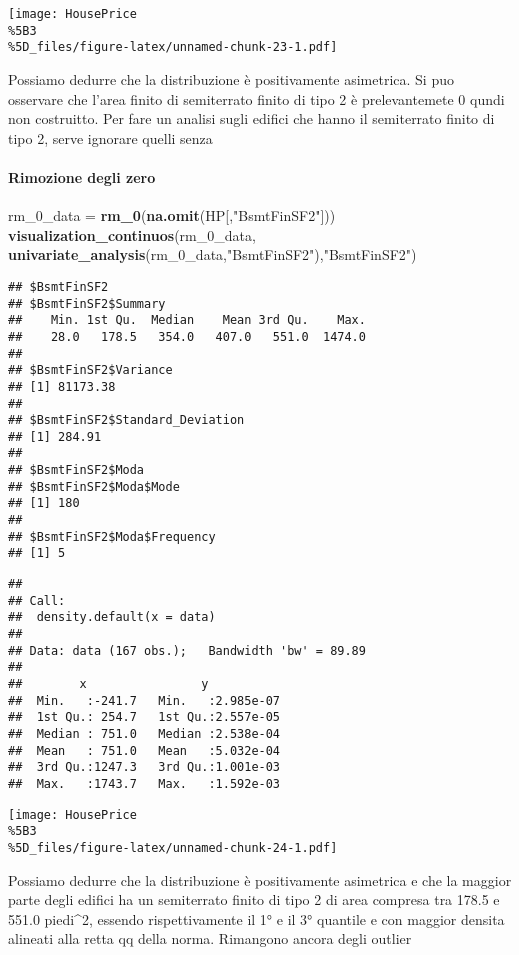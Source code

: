\documentclass[
]{article}
\newenvironment{Shaded}{\begin{snugshade}}{\end{snugshade}}
\newcommand{\FunctionTok}[1]{\textcolor[rgb]{0.13,0.29,0.53}{\textbf{#1}}}
\newcommand{\NormalTok}[1]{#1}
\newcommand{\OtherTok}[1]{\textcolor[rgb]{0.56,0.35,0.01}{#1}}
\newcommand{\StringTok}[1]{\textcolor[rgb]{0.31,0.60,0.02}{#1}}
\begin{document}
\texttt{[image: HousePrice\\\%5B3\\\%5D\_files/figure-latex/unnamed-chunk-23-1.pdf]}

Possiamo dedurre che la distribuzione è positivamente asimetrica. Si puo
osservare che l'area finito di semiterrato finito di tipo 2 è
prelevantemete 0 qundi non costruitto. Per fare un analisi sugli edifici
che hanno il semiterrato finito di tipo 2, serve ignorare quelli senza

\paragraph{Rimozione degli zero}\label{rimozione-degli-zero-3}

\begin{Shaded}
\begin{Highlighting}[]
\NormalTok{rm\_0\_data }\OtherTok{=} \FunctionTok{rm\_0}\NormalTok{(}\FunctionTok{na.omit}\NormalTok{(HP[,}\StringTok{"BsmtFinSF2"}\NormalTok{]))}
\FunctionTok{visualization\_continuos}\NormalTok{(rm\_0\_data, }\FunctionTok{univariate\_analysis}\NormalTok{(rm\_0\_data,}\StringTok{"BsmtFinSF2"}\NormalTok{),}\StringTok{"BsmtFinSF2"}\NormalTok{)}
\end{Highlighting}
\end{Shaded}

\begin{verbatim}
## $BsmtFinSF2
## $BsmtFinSF2$Summary
##    Min. 1st Qu.  Median    Mean 3rd Qu.    Max. 
##    28.0   178.5   354.0   407.0   551.0  1474.0 
## 
## $BsmtFinSF2$Variance
## [1] 81173.38
## 
## $BsmtFinSF2$Standard_Deviation
## [1] 284.91
## 
## $BsmtFinSF2$Moda
## $BsmtFinSF2$Moda$Mode
## [1] 180
## 
## $BsmtFinSF2$Moda$Frequency
## [1] 5
\end{verbatim}

\begin{verbatim}
## 
## Call:
##  density.default(x = data)
## 
## Data: data (167 obs.);   Bandwidth 'bw' = 89.89
## 
##        x                y            
##  Min.   :-241.7   Min.   :2.985e-07  
##  1st Qu.: 254.7   1st Qu.:2.557e-05  
##  Median : 751.0   Median :2.538e-04  
##  Mean   : 751.0   Mean   :5.032e-04  
##  3rd Qu.:1247.3   3rd Qu.:1.001e-03  
##  Max.   :1743.7   Max.   :1.592e-03
\end{verbatim}

\texttt{[image: HousePrice\\\%5B3\\\%5D\_files/figure-latex/unnamed-chunk-24-1.pdf]}

Possiamo dedurre che la distribuzione è positivamente asimetrica e che
la maggior parte degli edifici ha un semiterrato finito di tipo 2 di
area compresa tra 178.5 e 551.0 piedi\^{}2, essendo rispettivamente il
1° e il 3° quantile e con maggior densita alineati alla retta qq della
norma. Rimangono ancora degli outlier
\end{document}
